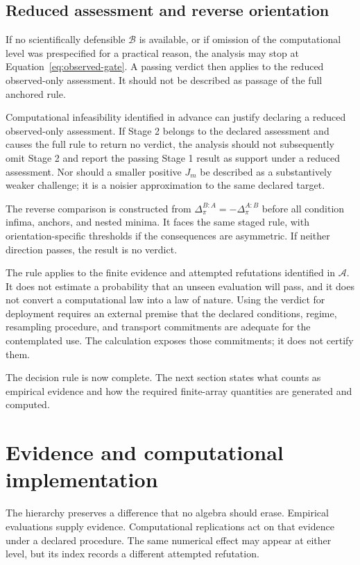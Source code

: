 \documentclass[11pt]{article}
\newcommand{\Assess}{\mathcal{A}}
\newcommand{\Boot}{\mathcal{B}}
\theoremstyle{remark}
\begin{document}
\subsection{Reduced assessment and reverse orientation}

If no scientifically defensible $\Boot$ is available, or if omission of the
computational level was prespecified for a practical reason, the analysis may
stop at Equation~\eqref{eq:observed-gate}. A passing verdict then applies to
the reduced observed-only assessment. It should not be described as passage of
the full anchored rule.

Computational infeasibility identified in advance can justify declaring a
reduced observed-only assessment. If Stage 2 belongs to the declared
assessment and causes the full rule to return no verdict, the analysis should
not subsequently omit Stage 2 and report the passing Stage 1 result as support
under a reduced assessment. Nor should a smaller positive $J_m$ be described
as a substantively weaker challenge; it is a noisier approximation to the same
declared target.

The reverse comparison is constructed from
$\Delta^{B:A}_\pi=-\Delta^{A:B}_\pi$ before all condition infima, anchors,
and nested minima. It faces the same staged rule, with orientation-specific
thresholds if the consequences are asymmetric. If neither direction passes,
the result is no verdict.

The rule applies to the finite evidence and attempted refutations identified
in $\Assess$. It does not estimate a probability that an unseen
evaluation will pass, and it does not convert a computational law into a law of
nature. Using the verdict for deployment requires an external premise that the
declared conditions, regime, resampling procedure, and transport commitments
are adequate for the contemplated use. The calculation exposes those
commitments; it does not certify them.

The decision rule is now complete. The next section states what counts as
empirical evidence and how the required finite-array quantities are generated
and computed.


\section{Evidence and computational implementation}
\label{sec:evidence}

The hierarchy preserves a difference that no algebra should erase. Empirical
evaluations supply evidence. Computational replications act on that evidence
under a declared procedure. The same numerical effect may appear at either
level, but its index records a different attempted refutation.
\end{document}
